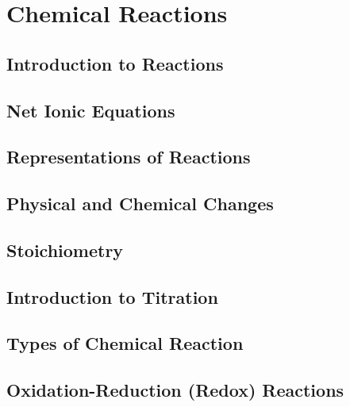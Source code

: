 \documentclass[../chem.tex]{subfiles}
\begin{document}
\chapter{Chemical Reactions}
\section{Introduction to Reactions}
\section{Net Ionic Equations}
\section{Representations of Reactions}
\section{Physical and Chemical Changes}
\section{Stoichiometry}
\section{Introduction to Titration}
\section{Types of Chemical Reaction}
\section{Oxidation-Reduction (Redox) Reactions}
\end{document}
